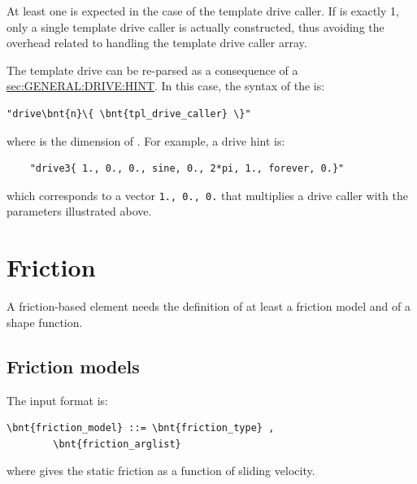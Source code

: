 At least one  is expected in the case of the 
template drive caller. 
If  is exactly 1, only a single
template drive caller is actually constructed, thus avoiding the overhead 
related to handling the template drive caller array.    

The template drive can be re-parsed as a consequence of a
\hyperref{\kw{hint}}{\kw{hint} (see Section~}{)}{sec:GENERAL:DRIVE:HINT}.
In this case, the syntax of the  is:
\begin{Verbatim}[commandchars=\\\{\}]
    "drive\bnt{n}\{ \bnt{tpl_drive_caller} \}"
\end{Verbatim}
where  is the dimension of .
For example, a  drive hint is:
\begin{verbatim}
    "drive3{ 1., 0., 0., sine, 0., 2*pi, 1., forever, 0.}"
\end{verbatim}
which corresponds to a vector \texttt{1., 0., 0.} that multiplies
a  drive caller with the parameters illustrated above.






\section{Friction}
A friction-based element needs the definition of
at least a friction model and of a shape function.

\subsection{Friction models}
The  input format is:
\begin{Verbatim}[commandchars=\\\{\}]
    \bnt{friction_model} ::= \bnt{friction_type} ,
        \bnt{friction_arglist}
\end{Verbatim}
where  gives the static friction
as a function of sliding velocity.

